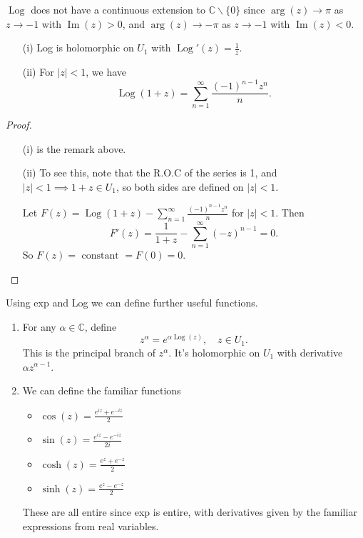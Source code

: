 \documentclass[a4paper]{scrartcl}
\begin{document}
\begin{remark}
      $\operatorname{Log}$ does not have a continuous extension to $\mathbb{C} \backslash\{0\}$ since $\arg (z) \rightarrow \pi$ as $z \rightarrow-1$ with $\operatorname{Im}(z)>0$, and $\arg (z) \rightarrow-\pi$ as $z \rightarrow-1$ with $\operatorname{Im}(z)<0$.
\end{remark}
\begin{proposition}
      \begin{itemize}
           \item[(i)] Log is holomorphic on $U_1 $ with $\operatorname{Log}' (z)=\frac{1}{z}$. 
           \item[(ii)] For $|z|<1$, we have \[
           \operatorname{Log}(1+z)=\sum_{n=1}^{ \infty} \frac{(-1)^{n-1}z^{n}}{n}
           .\] 
      \end{itemize} 
\end{proposition}
\begin{proof}
      \begin{itemize}
           \item[(i)] is the remark above. 
           \item[(ii)] To see this, note that the R.O.C of the series is 1, and $|z|<1 \implies 1+z \in U_1 $, so both sides are defined on $|z|<1$. 
           
           Let $F (z)=\operatorname{Log}(1+z)-\sum_{n=1}^{ \infty} \frac{(-1)^{n-1}z^{n}}{n}$ for $|z|<1$. Then \[
           F' (z)= \frac{1}{1+z}-\sum_{n=1}^{ \infty}(-z)^{n-1}=0
           .\] So $F (z)=\text{ constant } =F (0)=0$.
      \end{itemize}
\end{proof}
Using exp and Log we can define further useful functions. 
\begin{enumerate}
     \item For any $\alpha \in \mathbb{C}$, define \[
     z^{\alpha}=e^{\alpha \operatorname{Log}(z)}, \quad z \in U_1 
     .\] This is the principal branch of $z^{\alpha}$. It's holomorphic on $U_1 $ with derivative $\alpha z^{\alpha-1}$. 
     \item We can define the familiar functions 
     \begin{itemize}
          \item $\cos (z)= \frac{e^{iz}+e^{-iz}}{2}$ 
          \item $\sin (z)= \frac{e^{iz}-e^{-iz}}{2i}$ 
          \item $\cosh (z)= \frac{e^{z}+e^{-z}}{2}$ 
          \item $\sinh (z)= \frac{e^{z}-e^{-z}}{2}$ 
     \end{itemize}
     These are all entire since exp is entire, with derivatives given by the familiar expressions from real variables.
\end{enumerate}
\end{document}
